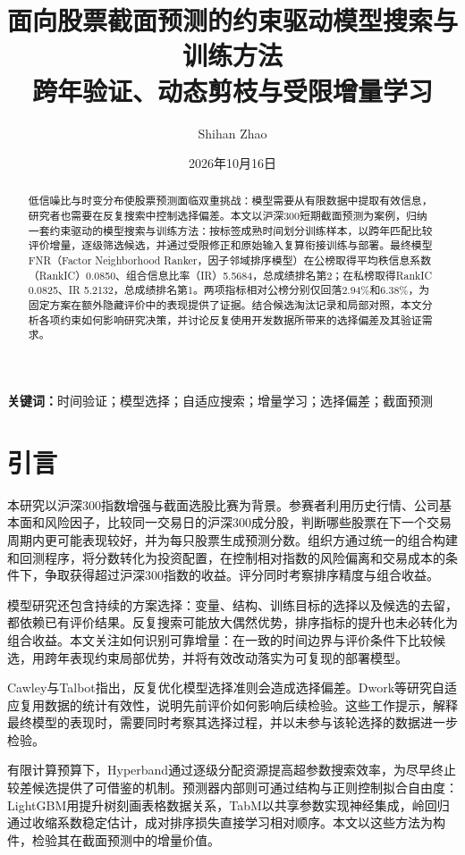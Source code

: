 \documentclass[UTF8,11pt,a4paper,fontset=fandol]{ctexart}
\title{\bfseries 面向股票截面预测的约束驱动模型搜索与训练方法\\[0.35em]\large 跨年验证、动态剪枝与受限增量学习}
\author{Shihan Zhao}
\date{2026年10月16日}
\makeatletter
\renewcommand{\maketitle}{%
  \thispagestyle{plain}%
  \begin{center}
    {\LARGE\@title\par}\vspace{.65em}
    {\normalsize\@author\par}\vspace{.35em}
    {\small\@date\par}
  \end{center}\vspace{.5em}%
}
\makeatother
\begin{document}
\maketitle
\begin{abstract}
低信噪比与时变分布使股票预测面临双重挑战：模型需要从有限数据中提取有效信息，研究者也需要在反复搜索中控制选择偏差。本文以沪深300短期截面预测为案例，归纳一套约束驱动的模型搜索与训练方法：按标签成熟时间划分训练样本，以跨年匹配比较评价增量，逐级筛选候选，并通过受限修正和原始输入复算衔接训练与部署。最终模型FNR（Factor Neighborhood Ranker，因子邻域排序模型）在公榜取得平均秩信息系数（RankIC）0.0850、组合信息比率（IR）5.5684，总成绩排名第2；在私榜取得RankIC 0.0825、IR 5.2132，总成绩排名第1。两项指标相对公榜分别仅回落2.94\%和6.38\%，为固定方案在额外隐藏评价中的表现提供了证据。结合候选淘汰记录和局部对照，本文分析各项约束如何影响研究决策，并讨论反复使用开发数据所带来的选择偏差及其验证需求。
\end{abstract}
\noindent\textbf{关键词：}时间验证；模型选择；自适应搜索；增量学习；选择偏差；截面预测

\section{引言}
本研究以沪深300指数增强与截面选股比赛为背景。参赛者利用历史行情、公司基本面和风险因子，比较同一交易日的沪深300成分股，判断哪些股票在下一个交易周期内更可能表现较好，并为每只股票生成预测分数。组织方通过统一的组合构建和回测程序，将分数转化为投资配置，在控制相对指数的风险偏离和交易成本的条件下，争取获得超过沪深300指数的收益。评分同时考察排序精度与组合收益。

模型研究还包含持续的方案选择：变量、结构、训练目标的选择以及候选的去留，都依赖已有评价结果。反复搜索可能放大偶然优势，排序指标的提升也未必转化为组合收益。本文关注如何识别可靠增量：在一致的时间边界与评价条件下比较候选，用跨年表现约束局部优势，并将有效改动落实为可复现的部署模型。

Cawley与Talbot\cite{cawley2010}指出，反复优化模型选择准则会造成选择偏差。Dwork等\cite{dwork2015}研究自适应复用数据的统计有效性，说明先前评价如何影响后续检验。这些工作提示，解释最终模型的表现时，需要同时考察其选择过程，并以未参与该轮选择的数据进一步检验。

有限计算预算下，Hyperband\cite{li2018}通过逐级分配资源提高超参数搜索效率，为尽早终止较差候选提供了可借鉴的机制。预测器内部则可通过结构与正则控制拟合自由度：LightGBM\cite{ke2017}用提升树刻画表格数据关系，TabM\cite{gorishniy2025}以共享参数实现神经集成，岭回归\cite{hoerl1970}通过收缩系数稳定估计，成对排序损失\cite{burges2005}直接学习相对顺序。本文以这些方法为构件，检验其在截面预测中的增量价值。
\end{document}
